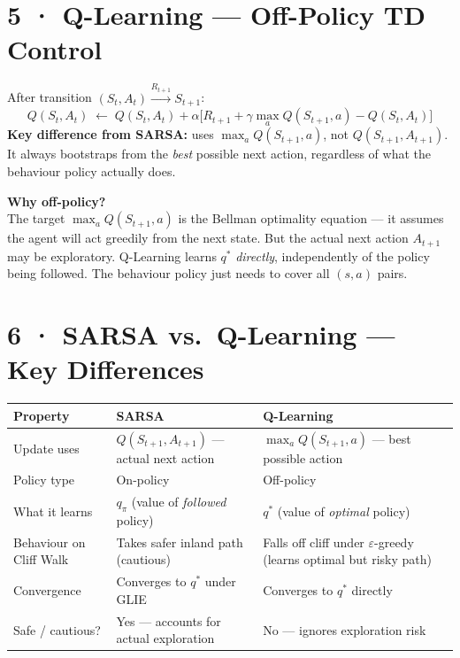 \documentclass[11pt,a4paper]{article}
\begin{document}
\section*{5 · Q-Learning — Off-Policy TD Control}

\begin{tcolorbox}[bold={Q-Learning Update Rule}]
After transition $(S_t, A_t) \xrightarrow{R_{t+1}} S_{t+1}$:
\[
  Q(S_t, A_t) \;\leftarrow\; Q(S_t, A_t)
    + \alpha\bigl[R_{t+1} + \gamma \max_{a} Q(S_{t+1}, a) - Q(S_t, A_t)\bigr]
\]
\textbf{Key difference from SARSA:} uses $\max_a Q(S_{t+1}, a)$, not $Q(S_{t+1}, A_{t+1})$.
It always bootstraps from the \emph{best} possible next action, regardless of what the
behaviour policy actually does.
\end{tcolorbox}

\textbf{Why off-policy?}\\
The target $\max_a Q(S_{t+1}, a)$ is the Bellman optimality equation — it assumes the agent
will act greedily from the next state. But the actual next action $A_{t+1}$ may be exploratory.
Q-Learning learns $q^*$ \emph{directly}, independently of the policy being followed.
The behaviour policy just needs to cover all $(s,a)$ pairs.

\section*{6 · SARSA vs.\ Q-Learning — Key Differences}

\begin{tcolorbox}[defn={Side-by-Side Comparison}]
\begin{tabular}{p{3.8cm}p{4.8cm}p{5cm}}
\toprule
\textbf{Property} & \textbf{SARSA} & \textbf{Q-Learning} \\
\midrule
Update uses & $Q(S_{t+1}, A_{t+1})$ — actual next action & $\max_a Q(S_{t+1}, a)$ — best possible action \\
Policy type & On-policy & Off-policy \\
What it learns & $q_\pi$ (value of \emph{followed} policy) & $q^*$ (value of \emph{optimal} policy) \\
Behaviour on Cliff Walk & Takes safer inland path (cautious) & Falls off cliff under $\varepsilon$-greedy (learns optimal but risky path) \\
Convergence & Converges to $q^*$ under GLIE & Converges to $q^*$ directly \\
Safe / cautious? & Yes — accounts for actual exploration & No — ignores exploration risk \\
\bottomrule
\end{tabular}
\end{tcolorbox}
\end{document}
